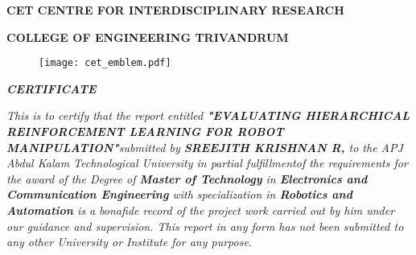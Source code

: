 \newpage


\thispagestyle{empty}

\begin{center}  {\bfseries CET CENTRE FOR INTERDISCIPLINARY RESEARCH}\end{center}
\begin{center}  {\bfseries COLLEGE OF ENGINEERING TRIVANDRUM}\end{center}

\begin{figure}[hbt]
	\centering
	\centerline{\texttt{[image: cet\_emblem.pdf]}}
\end{figure}
\begin{center}  {\Large \textit  {\textbf{CERTIFICATE}}}\vspace{.1cm}\end{center}

{\it \indent \indent This is to certify that the report entitled \emph{{\bf{"EVALUATING HIERARCHICAL REINFORCEMENT LEARNING FOR ROBOT MANIPULATION"}}}submitted by {\bf{ SREEJITH KRISHNAN R,}} to the APJ Abdul Kalam Technological University in partial fulfillmentof the requirements for the award of the Degree  of {\bf{Master  of  Technology}} in {\bf{Electronics and Communication Engineering}} with specialization in {\bf{Robotics and Automation}} is a bonafide record of the project work carried out by him under our guidance  and  supervision. This report in any form has not been submitted to any other University or Institute for any purpose.
}
\vspace{1cm}

